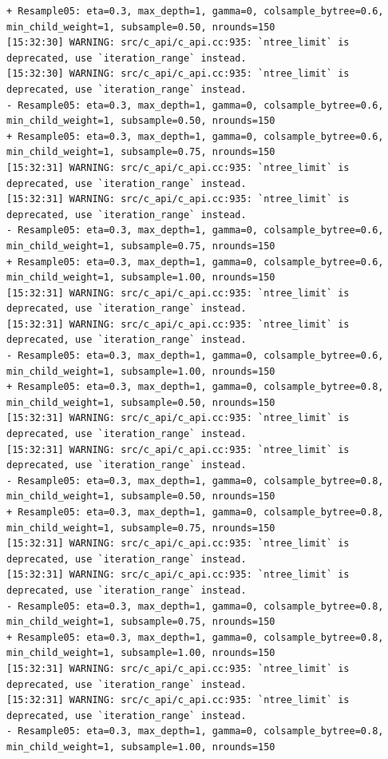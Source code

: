 \documentclass[
  letterpaper,
  DIV=11,
  numbers=noendperiod]{scrartcl}
\begin{document}
\begin{verbatim}
+ Resample05: eta=0.3, max_depth=1, gamma=0, colsample_bytree=0.6, min_child_weight=1, subsample=0.50, nrounds=150 
[15:32:30] WARNING: src/c_api/c_api.cc:935: `ntree_limit` is deprecated, use `iteration_range` instead.
[15:32:30] WARNING: src/c_api/c_api.cc:935: `ntree_limit` is deprecated, use `iteration_range` instead.
- Resample05: eta=0.3, max_depth=1, gamma=0, colsample_bytree=0.6, min_child_weight=1, subsample=0.50, nrounds=150 
+ Resample05: eta=0.3, max_depth=1, gamma=0, colsample_bytree=0.6, min_child_weight=1, subsample=0.75, nrounds=150 
[15:32:31] WARNING: src/c_api/c_api.cc:935: `ntree_limit` is deprecated, use `iteration_range` instead.
[15:32:31] WARNING: src/c_api/c_api.cc:935: `ntree_limit` is deprecated, use `iteration_range` instead.
- Resample05: eta=0.3, max_depth=1, gamma=0, colsample_bytree=0.6, min_child_weight=1, subsample=0.75, nrounds=150 
+ Resample05: eta=0.3, max_depth=1, gamma=0, colsample_bytree=0.6, min_child_weight=1, subsample=1.00, nrounds=150 
[15:32:31] WARNING: src/c_api/c_api.cc:935: `ntree_limit` is deprecated, use `iteration_range` instead.
[15:32:31] WARNING: src/c_api/c_api.cc:935: `ntree_limit` is deprecated, use `iteration_range` instead.
- Resample05: eta=0.3, max_depth=1, gamma=0, colsample_bytree=0.6, min_child_weight=1, subsample=1.00, nrounds=150 
+ Resample05: eta=0.3, max_depth=1, gamma=0, colsample_bytree=0.8, min_child_weight=1, subsample=0.50, nrounds=150 
[15:32:31] WARNING: src/c_api/c_api.cc:935: `ntree_limit` is deprecated, use `iteration_range` instead.
[15:32:31] WARNING: src/c_api/c_api.cc:935: `ntree_limit` is deprecated, use `iteration_range` instead.
- Resample05: eta=0.3, max_depth=1, gamma=0, colsample_bytree=0.8, min_child_weight=1, subsample=0.50, nrounds=150 
+ Resample05: eta=0.3, max_depth=1, gamma=0, colsample_bytree=0.8, min_child_weight=1, subsample=0.75, nrounds=150 
[15:32:31] WARNING: src/c_api/c_api.cc:935: `ntree_limit` is deprecated, use `iteration_range` instead.
[15:32:31] WARNING: src/c_api/c_api.cc:935: `ntree_limit` is deprecated, use `iteration_range` instead.
- Resample05: eta=0.3, max_depth=1, gamma=0, colsample_bytree=0.8, min_child_weight=1, subsample=0.75, nrounds=150 
+ Resample05: eta=0.3, max_depth=1, gamma=0, colsample_bytree=0.8, min_child_weight=1, subsample=1.00, nrounds=150 
[15:32:31] WARNING: src/c_api/c_api.cc:935: `ntree_limit` is deprecated, use `iteration_range` instead.
[15:32:31] WARNING: src/c_api/c_api.cc:935: `ntree_limit` is deprecated, use `iteration_range` instead.
- Resample05: eta=0.3, max_depth=1, gamma=0, colsample_bytree=0.8, min_child_weight=1, subsample=1.00, nrounds=150 

\end{verbatim}
\end{document}
